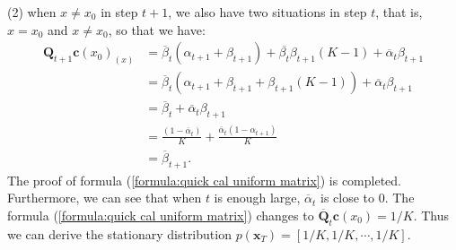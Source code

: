 \documentclass[lettersize,journal]{IEEEtran}
\begin{document}
(2) when $x \neq x_0$ in step $t+1$, we also have two situations in step $t$, that is, $x=x_0$ and $x \neq x_0$,  so that we have:
\begin{equation}\label{formula:proof3}
\begin{aligned}
  \boldsymbol{Q}_{t+1}\boldsymbol{c}(x_0)_{(x)}&=\overline{\beta}_t(\alpha_{t+1}+\beta_{t+1}) +\overline{\beta_t}\beta_{t+1}(K-1) + \overline{\alpha}_t\beta_{t+1} \\
  &=\overline{\beta}_t(\alpha_{t+1}+\beta_{t+1}+\beta_{t+1}(K-1))+
  \overline{\alpha}_t\beta_{t+1} \\
  &= \overline{\beta}_t +  \overline{\alpha}_t\beta_{t+1} \\
  &= \frac{(1-\overline{\alpha}_t)}{K} + \frac{\overline{\alpha}_t(1-\alpha_{t+1})}{K} \\
&= \overline{\beta}_{t+1}.
\end{aligned}
\end{equation}
The proof of formula (\ref{formula:quick cal uniform matrix}) is completed. \\
Furthermore, we can see that when $t$ is enough large, $\overline{\alpha}_t$ is close to 0. The formula (\ref{formula:quick cal uniform matrix}) changes to $\overline{\boldsymbol{Q}}_t \boldsymbol{c}(x_0) = 1/K$. Thus we can derive the stationary distribution $p(\boldsymbol{x}_T)=[1/K, 1/K, \cdots, 1/K]$.
\end{document}
